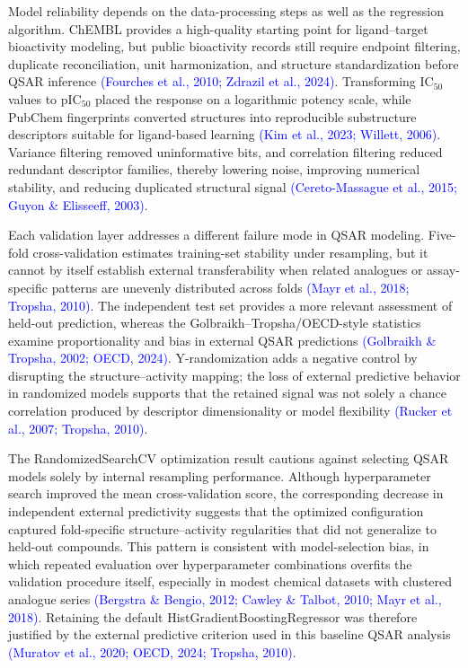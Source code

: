 \documentclass[11pt]{article}
\begin{document}
Model reliability depends on the data-processing steps as well as the regression algorithm. ChEMBL provides a high-quality starting point for ligand--target bioactivity modeling, but public bioactivity records still require endpoint filtering, duplicate reconciliation, unit harmonization, and structure standardization before QSAR inference \textcolor{blue}{(Fourches et al., 2010; Zdrazil et al., 2024)}. Transforming IC$_{50}$ values to pIC$_{50}$ placed the response on a logarithmic potency scale, while PubChem fingerprints converted structures into reproducible substructure descriptors suitable for ligand-based learning \textcolor{blue}{(Kim et al., 2023; Willett, 2006)}. Variance filtering removed uninformative bits, and correlation filtering reduced redundant descriptor families, thereby lowering noise, improving numerical stability, and reducing duplicated structural signal \textcolor{blue}{(Cereto-Massague et al., 2015; Guyon \& Elisseeff, 2003)}.

Each validation layer addresses a different failure mode in QSAR modeling. Five-fold cross-validation estimates training-set stability under resampling, but it cannot by itself establish external transferability when related analogues or assay-specific patterns are unevenly distributed across folds \textcolor{blue}{(Mayr et al., 2018; Tropsha, 2010)}. The independent test set provides a more relevant assessment of held-out prediction, whereas the Golbraikh--Tropsha/OECD-style statistics examine proportionality and bias in external QSAR predictions \textcolor{blue}{(Golbraikh \& Tropsha, 2002; OECD, 2024)}. Y-randomization adds a negative control by disrupting the structure--activity mapping; the loss of external predictive behavior in randomized models supports that the retained signal was not solely a chance correlation produced by descriptor dimensionality or model flexibility \textcolor{blue}{(Rucker et al., 2007; Tropsha, 2010)}.

The RandomizedSearchCV optimization result cautions against selecting QSAR models solely by internal resampling performance. Although hyperparameter search improved the mean cross-validation score, the corresponding decrease in independent external predictivity suggests that the optimized configuration captured fold-specific structure--activity regularities that did not generalize to held-out compounds. This pattern is consistent with model-selection bias, in which repeated evaluation over hyperparameter combinations overfits the validation procedure itself, especially in modest chemical datasets with clustered analogue series \textcolor{blue}{(Bergstra \& Bengio, 2012; Cawley \& Talbot, 2010; Mayr et al., 2018)}. Retaining the default HistGradientBoostingRegressor was therefore justified by the external predictive criterion used in this baseline QSAR analysis \textcolor{blue}{(Muratov et al., 2020; OECD, 2024; Tropsha, 2010)}.
\end{document}

